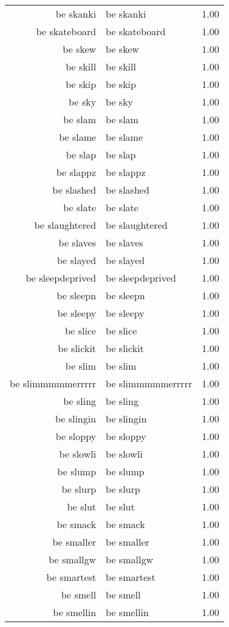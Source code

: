 \begin{table}[ht]
\begin{tabular}{rlr}
  be skanki & be skanki & 1.00 \\ 
  be skateboard & be skateboard & 1.00 \\ 
  be skew & be skew & 1.00 \\ 
  be skill & be skill & 1.00 \\ 
  be skip & be skip & 1.00 \\ 
  be sky & be sky & 1.00 \\ 
  be slam & be slam & 1.00 \\ 
  be slame & be slame & 1.00 \\ 
  be slap & be slap & 1.00 \\ 
  be slappz & be slappz & 1.00 \\ 
  be slashed & be slashed & 1.00 \\ 
  be slate & be slate & 1.00 \\ 
  be slaughtered & be slaughtered & 1.00 \\ 
  be slaves & be slaves & 1.00 \\ 
  be slayed & be slayed & 1.00 \\ 
  be sleepdeprived & be sleepdeprived & 1.00 \\ 
  be sleepn & be sleepn & 1.00 \\ 
  be sleepy & be sleepy & 1.00 \\ 
  be slice & be slice & 1.00 \\ 
  be slickit & be slickit & 1.00 \\ 
  be slim & be slim & 1.00 \\ 
  be slimmmmmerrrrr & be slimmmmmerrrrr & 1.00 \\ 
  be sling & be sling & 1.00 \\ 
  be slingin & be slingin & 1.00 \\ 
  be sloppy & be sloppy & 1.00 \\ 
  be slowli & be slowli & 1.00 \\ 
  be slump & be slump & 1.00 \\ 
  be slurp & be slurp & 1.00 \\ 
  be slut & be slut & 1.00 \\ 
  be smack & be smack & 1.00 \\ 
  be smaller & be smaller & 1.00 \\ 
  be smallgw & be smallgw & 1.00 \\ 
  be smartest & be smartest & 1.00 \\ 
  be smell & be smell & 1.00 \\ 
  be smellin & be smellin & 1.00 \\ 

\end{tabular}
\end{table}
